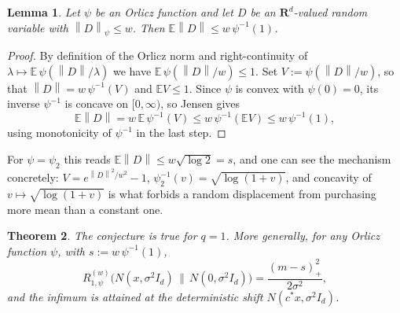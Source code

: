 \documentclass[10pt,a4paper]{amsart}
\newtheorem{theorem}{Theorem}
\newtheorem{lemma}[theorem]{Lemma}
\def\R{\mathbf{R}}
\newcommand{\ee}{\mathbb{E}}
\newcommand{\norm}[1]{\left\lVert#1\right\rVert}
\numberwithin{equation}{section}
\begin{document}
\begin{lemma}\label{lem:jensen}
Let $\psi$ be an Orlicz function and let $D$ be an $\R^d$-valued random variable with $\norm{D}_{\psi}\le w$. Then $\ee\norm{D}\le w\,\psi^{-1}(1)$.
\end{lemma}

\begin{proof}
By definition of the Orlicz norm and right-continuity of $\lambda\mapsto \ee\,\psi(\norm{D}/\lambda)$ we have $\ee\,\psi(\norm{D}/w)\le 1$. Set $V:=\psi(\norm{D}/w)$, so that $\norm{D}=w\,\psi^{-1}(V)$ and $\ee V\le 1$. Since $\psi$ is convex with $\psi(0)=0$, its inverse $\psi^{-1}$ is concave on $[0,\infty)$, so Jensen gives
$$\ee\norm{D}=w\,\ee\,\psi^{-1}(V)\le w\,\psi^{-1}(\ee V)\le w\,\psi^{-1}(1),$$
using monotonicity of $\psi^{-1}$ in the last step.
\end{proof}

For $\psi=\psi_2$ this reads $\ee\norm{D}\le w\sqrt{\log 2}=s$, and one can see the mechanism concretely: $V=e^{\norm{D}^2/w^2}-1$, $\psi_2^{-1}(v)=\sqrt{\log(1+v)}$, and concavity of $v\mapsto\sqrt{\log(1+v)}$ is what forbids a random displacement from purchasing more mean than a constant one.

\begin{theorem}\label{thm:q1}
The conjecture is true for $q=1$. More generally, for any Orlicz function $\psi$, with $s:=w\,\psi^{-1}(1)$,
$$R^{(w)}_{1,\psi}\big(N(x,\sigma^2I_d)\,\big\|\,N(0,\sigma^2I_d)\big)=\frac{(m-s)_+^2}{2\sigma^2},$$
and the infimum is attained at the deterministic shift $N(c^*x,\sigma^2I_d)$.
\end{theorem}
\end{document}
